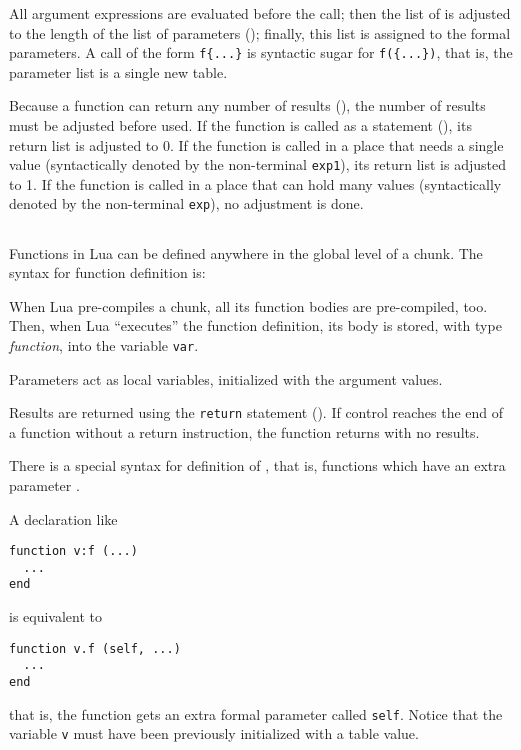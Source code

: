 \begin{Produc}
\end{Produc}%
All argument expressions are evaluated before the call;
then the list of  is adjusted to
the length of the list of parameters ();
finally, this list is assigned to the formal parameters.
A call of the form \verb'f{...}' is syntactic sugar for
\verb'f({...})', that is,
the parameter list is a single new table.

Because a function can return any number of results
(),
the number of results must be adjusted before used.
If the function is called as a statement (),
its return list is adjusted to 0.
If the function is called in a place that needs a single value
(syntactically denoted by the non-terminal \verb'exp1'),
its return list is adjusted to 1.
If the function is called in a place that can hold many values
(syntactically denoted by the non-terminal \verb'exp'),
no adjustment is done.


\subsection{}

Functions in Lua can be defined anywhere in the global level of a chunk.
The syntax for function definition is:
\begin{Produc}
\end{Produc}

When Lua pre-compiles a chunk,
all its function bodies are pre-compiled, too.
Then, when Lua ``executes'' the function definition,
its body is stored, with type {\em function},
into the variable \verb'var'.

Parameters act as local variables,
initialized with the argument values.
\begin{Produc}
\end{Produc}

Results are returned using the \verb'return' statement ().
If control reaches the end of a function without a return instruction,
the function returns with no results.

There is a special syntax for definition of ,
that is, functions which have an extra parameter .
\begin{Produc}
\end{Produc}%
A declaration like
\begin{verbatim}
function v:f (...)
  ...
end
\end{verbatim}
is equivalent to
\begin{verbatim}
function v.f (self, ...)
  ...
end
\end{verbatim}
that is, the function gets an extra formal parameter called \verb'self'.
Notice that
the variable \verb'v' must have been previously initialized with a table value.


